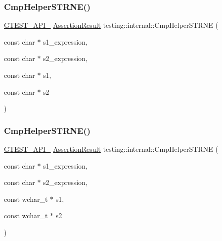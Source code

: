 \mbox{\label{namespacetesting_1_1internal_a6b485231a046ff760844a0321c04870b}} 
\subsubsection{\texorpdfstring{CmpHelperSTRNE()}{CmpHelperSTRNE()}\hspace{0.1cm}{\footnotesize\ttfamily [1/2]}}
{\footnotesize\ttfamily \mbox{\hyperlink{gtest-port_8h_aa73be6f0ba4a7456180a94904ce17790}{G\+T\+E\+S\+T\+\_\+\+A\+P\+I\+\_\+}} \mbox{\hyperlink{classtesting_1_1_assertion_result}{Assertion\+Result}} testing\+::internal\+::\+Cmp\+Helper\+S\+T\+R\+NE (\begin{DoxyParamCaption}\item[{const char $\ast$}]{s1\+\_\+expression,  }\item[{const char $\ast$}]{s2\+\_\+expression,  }\item[{const char $\ast$}]{s1,  }\item[{const char $\ast$}]{s2 }\end{DoxyParamCaption})}

\mbox{\label{namespacetesting_1_1internal_a6e700804399b6694d8d6157e3a141b17}} 
\subsubsection{\texorpdfstring{CmpHelperSTRNE()}{CmpHelperSTRNE()}\hspace{0.1cm}{\footnotesize\ttfamily [2/2]}}
{\footnotesize\ttfamily \mbox{\hyperlink{gtest-port_8h_aa73be6f0ba4a7456180a94904ce17790}{G\+T\+E\+S\+T\+\_\+\+A\+P\+I\+\_\+}} \mbox{\hyperlink{classtesting_1_1_assertion_result}{Assertion\+Result}} testing\+::internal\+::\+Cmp\+Helper\+S\+T\+R\+NE (\begin{DoxyParamCaption}\item[{const char $\ast$}]{s1\+\_\+expression,  }\item[{const char $\ast$}]{s2\+\_\+expression,  }\item[{const wchar\+\_\+t $\ast$}]{s1,  }\item[{const wchar\+\_\+t $\ast$}]{s2 }\end{DoxyParamCaption})}

